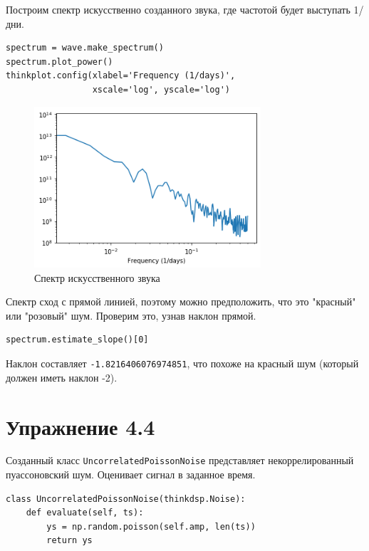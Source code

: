 \documentclass[a4paper,12pt]{report}
\begin{document}
Построим спектр искусственно созданного звука, где частотой будет выступать 1/дни.

\begin{lstlisting}[caption=Спектр искусственного звука]
spectrum = wave.make_spectrum()
spectrum.plot_power()
thinkplot.config(xlabel='Frequency (1/days)',
                 xscale='log', yscale='log')
\end{lstlisting}

\begin{figure}[H]
        \centering
        \includegraphics[width=0.75\textwidth]{lab4_fig3_3.png}
        \caption{Спектр искусственного звука}
        \label{fig:lab4_fig3_3}
\end{figure}

Спектр сход с прямой линией, поэтому можно предположить, что это "красный" или "розовый" шум. Проверим это, узнав наклон прямой.

\begin{lstlisting}[caption=Наклон прямой]
spectrum.estimate_slope()[0]
\end{lstlisting}

Наклон составляет \texttt{-1.8216406076974851}, что похоже на красный шум (который должен иметь наклон -2).

\chapter{Упражнение 4.4}

Созданный класс \texttt{UncorrelatedPoissonNoise} представляет некоррелированный пуассоновский шум. Оценивает сигнал в заданное время.

\begin{lstlisting}[caption=Созданный класс UncorrelatedPoissonNoise]
class UncorrelatedPoissonNoise(thinkdsp.Noise):
    def evaluate(self, ts):
        ys = np.random.poisson(self.amp, len(ts))
        return ys
\end{lstlisting}
\end{document}
